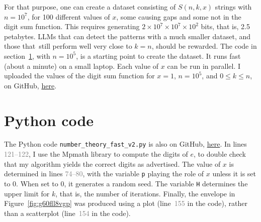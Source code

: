 \documentclass[10pt]{article}
\begin{document}
For that purpose, one can create a dataset consisting of $S(n, k, x)$ strings with $n=10^7$, for 100 different values of $x$, some causing gaps and some not in the digit sum function. This requires generating $2 \times 10^7 \times 10^7 \times 10^2$ bits, that is, 2.5 petabytes. LLMs that
 can detect the patterns with a much smaller dataset, and those that~still perform well very close to $k=n$, should be rewarded. 
The code in section~\ref{pyuferdma}, with $n=10^5$, is a starting point to create the dataset. It runs fast (about a minute) on a small laptop. 
Each value of $x$ can be run in parallel. 
I uploaded the values of the digit sum function for $x=1$, $n=10^5$, and $0\leq k \leq n$, on GitHub, 
\href{https://raw.githubusercontent.com/VincentGranville/Experimental-Math-Number-Theory/refs/heads/main/Source-Code/digit_sum_e1.txt}{here}. 


\section{Python code}\label{pyuferdma}

The Python code \texttt{number\_theory\_fast\_v2.py} is also on GitHub, 
\href{https://github.com/VincentGranville/Experimental-Math-Number-Theory/blob/main/Source-Code/number_theory_fast_v2.py}{here}. 
In lines \textcolor{gray}{121--122}, I use the Mpmath library to compute
 the digits of $e$, to double check that my algorithm yields the correct digits as advertised.
The value of $x$ is determined in lines \textcolor{gray}{74--80}, with the variable \texttt{p} playing the role of $x$ unless it is set to 0. 
When set to 0, it generates a random seed. The variable \texttt{H} determines the upper limit for $k$, that is, the number
 of iterations. Finally, the envelope in Figure~\ref{fig:g60fll8vgp} was produced using a plot (line~\textcolor{gray}{155} in the code),
 rather than a scatterplot (line~\textcolor{gray}{154} in the code).
\vspace{1ex}
\end{document}
